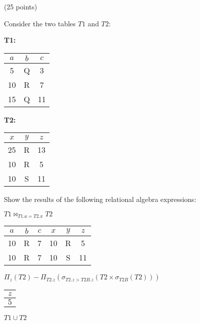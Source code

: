 \begin{problem} (25 points)

  \noindent
  Consider the two tables $T1$ and $T2$:

  \begin{multicols}{2}
    \textbf{T1:}
    
    \centering
    \begin{tabular}{|c|c|c|}
      \hline
      $a$ & $b$ & $c$ \\
      \hline
      5 & Q & 3 \\
      \hline
      10 & R & 7 \\
      \hline
      15 & Q & 11 \\
      \hline
    \end{tabular}

    \flushleft
    \textbf{T2:}

    \centering
    \begin{tabular}{|c|c|c|}
      \hline
      $x$ & $y$ & $z$ \\
      \hline
      25 & R & 13 \\
      \hline
      10 & R & 5 \\
      \hline
      10 & S & 11 \\
      \hline
    \end{tabular}
  \end{multicols}

  \noindent
  Show the results of the following relational algebra expressions:

  \begin{enumalph}
    \item $T1 \Join_{T1.a = T2.x} T2$
    
    \begin{Answer}
      \centering
      \begin{tabular}{|c|c|c|c|c|c|}
        \hline
        $a$ & $b$ & $c$ & $x$ & $y$ & $z$ \\
        \hline
        10 & R & 7 & 10 & R & 5 \\
        \hline
        10 & R & 7 & 10 & S & 11 \\
        \hline
      \end{tabular}
    \end{Answer}

    \item $\Pi_{z}(T2) - \Pi_{T2.z}(\sigma_{T2.z > T2B.z}(T2 \times \sigma_{T2B}(T2)))$
    
    \begin{Answer}
      \centering
      \begin{tabular}{|c|}
        \hline
        $z$ \\
        \hline
        $5$ \\
        \hline
      \end{tabular}
    \end{Answer}
    \item $T1 \cup T2$
    

\end{enumalph}
\end{problem}
